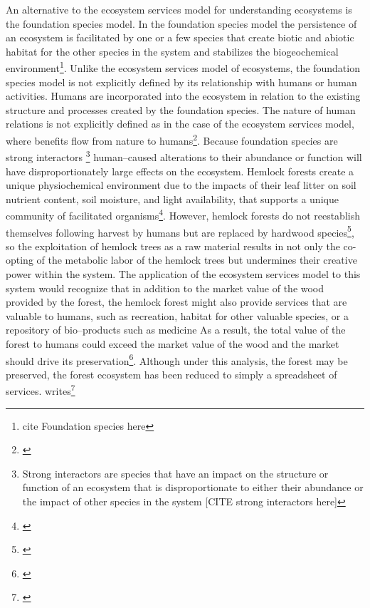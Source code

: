 \documentclass{article}
\begin{document}
{An alternative to the ecosystem services model for understanding ecosystems is the foundation species model. In the foundation species model the persistence of an ecosystem is facilitated by one or a few species that create biotic and abiotic habitat for the other species in the system and stabilizes the biogeochemical environment\footnote{cite Foundation species here}. Unlike the ecosystem services model of ecosystems, the foundation species model is not explicitly defined by its relationship with humans or human activities. Humans are incorporated into the ecosystem in relation to the existing structure and processes created by the foundation species. The nature of human relations is not explicitly defined as in the case of the ecosystem services model, where benefits flow from nature to humans\footnote{\cite{costanza_value_1998}}. Because foundation species are strong interactors
\footnote{Strong interactors are species that have an impact on the structure or function of an ecosystem that is disproportionate to either their abundance or the impact of other species in the system [CITE strong interactors here]}
human--caused alterations to their abundance or function will have disproportionately large effects on the ecosystem. Hemlock forests create a unique physiochemical environment due to the impacts of their leaf litter on soil nutrient content, soil moisture, and light availability, that supports a unique community of facilitated organisms\footnote{\cite{ellison_2005}}. However, hemlock forests do not reestablish themselves following harvest by humans but are replaced by hardwood species\footnote{\cite{ellison_2005}}, so the exploitation of hemlock trees as a raw material results in not only the co-opting of the metabolic labor of the hemlock trees but undermines their creative power within the system. The application of the ecosystem services model to this system would recognize that in addition to the market value of the wood provided by the forest, the hemlock forest might also provide services that are valuable to humans, such as recreation, habitat for other valuable species, or a repository of bio--products such as medicine
As a result, the total value of the forest to humans could exceed the market value of the wood and the market should drive its preservation\footnote{\cite{costanza_value_1998}}. Although under this analysis, the forest may be preserved, the forest ecosystem has been reduced to simply a spreadsheet of services. \citeauthor{battistoni_bringing_2017} writes\footnote{\cite[p. 11]{battistoni_bringing_2017}}

}
\end{document}

